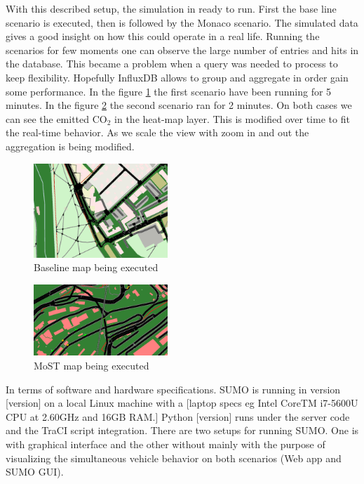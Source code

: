 \documentclass[letter, 10pt, conference]{ieeeconf}
\begin{document}
With this described setup, the simulation in ready to run.
First the base line scenario is executed, then is followed by the Monaco scenario.
The simulated data gives a good insight on how this could operate in a real life.
Running the scenarios for few moments one can observe the large number of entries and hits in the database.
This became a problem when a query was needed to process to keep flexibility.
Hopefully InfluxDB allows to group and aggregate in order gain some performance.
In the figure \ref{fig:map3} the first scenario have been running for 5 minutes.
In the figure \ref{fig:map4} the second scenario ran for 2 minutes.
On both cases we can see the emitted CO$_2$ in the heat-map layer.
This is modified over time to fit the real-time behavior.
As we scale the view with zoom in and out the aggregation is being modified.

\begin{figure}[h]
  \centering
  \includegraphics[width=0.45\textwidth]{map3}
  \caption{Baseline map being executed}
  \label{fig:map3}
\end{figure}

\begin{figure}[h]
  \centering
  \includegraphics[width=0.45\textwidth]{map4}
  \caption{MoST map being executed}
  \label{fig:map4}
\end{figure}

In terms of software and hardware specifications. SUMO is running in version [version] on a local Linux machine with a [laptop specs eg Intel CoreTM i7-5600U CPU at 2.60GHz and 16GB RAM.]
Python [version] runs under the server code and the TraCI script integration.
There are two setups for running SUMO.
One is with graphical interface and the other without mainly with the purpose of visualizing the simultaneous vehicle behavior on both scenarios (Web app and SUMO GUI).
\end{document}
